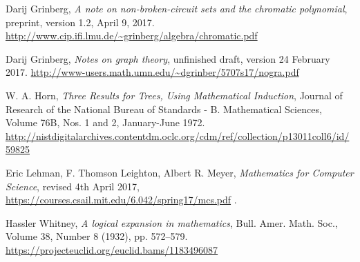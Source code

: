 \documentclass[numbers=enddot,12pt,final,onecolumn,notitlepage]{scrartcl}%
\theoremstyle{definition}
\begin{document}
\begin{thebibliography}{999999}

Darij Grinberg,
\textit{A note on non-broken-circuit sets and the chromatic polynomial},
preprint, version 1.2, April 9, 2017.
\newline
\url{http://www.cip.ifi.lmu.de/~grinberg/algebra/chromatic.pdf}

Darij Grinberg,
\textit{Notes on graph theory},
unfinished draft, version 24 February 2017.
\newline
\url{http://www-users.math.umn.edu/~dgrinber/5707s17/nogra.pdf}

W. A. Horn,
\textit{Three Results for Trees, Using Mathematical Induction},
Journal of Research of the National Bureau of Standards
- B. Mathematical Sciences,
Volume 76B, Nos. 1 and 2, January-June 1972.
\newline
\url{http://nistdigitalarchives.contentdm.oclc.org/cdm/ref/collection/p13011coll6/id/59825}

Eric Lehman, F. Thomson Leighton, Albert R. Meyer,
\textit{Mathematics for Computer Science},
revised 4th April 2017,
\newline\url{https://courses.csail.mit.edu/6.042/spring17/mcs.pdf} .

Hassler Whitney,
\textit{A logical expansion in mathematics},
Bull. Amer. Math. Soc.,
Volume 38, Number 8 (1932), pp. 572--579.
\newline
\url{https://projecteuclid.org/euclid.bams/1183496087}

\end{thebibliography}
\end{document}
